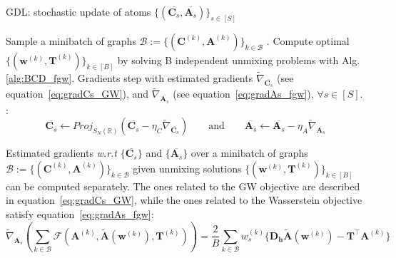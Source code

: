 \documentclass{article}
\def\eqref#1{equation~\ref{#1}}
\def\vh{{\bm{h}}}
\def\vw{{\bm{w}}}
\def\mA{{\bm{A}}}
\def\mC{{\bm{C}}}
\def\mD{{\bm{D}}}
\def\mT{{\bm{T}}}
\newcommand{\R}{\mathbb{R}}
\def\R{{\mathbb{R}}}
\begin{document}
	\begin{algorithm}[h]
		\caption{GDL: stochastic update of atoms $\{(\overline{\mC_s},\overline{\mA_s})\}_{s\in [S]}$}
		\label{alg:FGW1}
		\begin{algorithmic}[1]
			\STATE Sample a minibatch of graphs $\mathcal{B} :=\{(\mC^{(k)}, \mA^{(k)})\}_{k \in \mathcal{B}}$ .
			\STATE Compute optimal $\{(\vw^{(k)},\mT^{(k)})\}_{k \in [B]}$ by solving B independent unmixing problems with Alg.\ref{alg:BCD_fgw}. 
			\STATE Gradients step with estimated gradients $\widetilde{\nabla}_{\overline{\mC_s}}$ (see \eqref{eq:gradCs_GW}), and $\widetilde{\nabla}_{\overline{\mA_s}}$ (see \eqref{eq:gradAs_fgw}), $\forall s \in [S]$. : \vspace{-2mm}
			\begin{equation}
			\overline{\mC_s} \leftarrow Proj_{S_N(\R)}( \overline{\mC_s} - \eta_C \widetilde{\nabla}_{\overline{\mC_s}} )
			\qquad \text{and} \qquad
			\overline{\mA_s} \leftarrow  \overline{\mA_s} - \eta_A \widetilde{\nabla}_{\overline{\mA_s}} 
			\end{equation}
			
		\end{algorithmic}
	\end{algorithm}
	Estimated gradients \emph{w.r.t} $\{\overline{\mC_s}\}$ and $\{\overline{\mA_s}\}$ over a minibatch of graphs $\mathcal{B} :=\{(\mC^{(k)},\mA^{(k)})\}_{k \in \mathcal{B}}$ given unmixing solutions $\{(\vw^{(k)},\mT^{(k)})\}_{k \in [B]}$ can be computed separately. The ones related to the GW objective are described in \eqref{eq:gradCs_GW}, while the ones related to the Wasserstein objective satisfy \eqref{eq:gradAs_fgw}:
	\begin{equation}\label{eq:gradAs_fgw}
	\widetilde{\nabla}_{\overline{\mA_{s}}}\left(\sum_{k\in \mathcal{B}}\mathcal{F}(\mA^{(k)}, \widetilde{\mA}(\vw^{(k)}), \mT^{(k)})\right) = \frac{2}{B} \sum_{k \in \mathcal{B}}w^{(k)}_s \{\mD_{\vh}\widetilde{\mA}(\vw^{(k)}) - \mT^\top \mA^{(k)}\}
	\end{equation}
\end{document}

